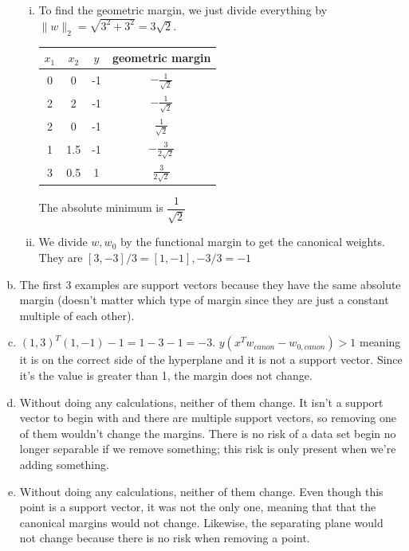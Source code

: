 \documentclass[12pt]{article}
\begin{document}
\begin{enumerate}[(a)]
\begin{enumerate}[i.]
			\item To find the geometric margin, we just divide everything by $ \|w\|_{2} = \sqrt{3^2 + 3^2}  = 3\sqrt{2}$.
			\begin{table}[H]
				\centering
				\begin{tabular}{|c|c|c|c|}
					\hline 
					$x_1$ & $ x_2 $ & $ y $ & geometric margin\\\hline
					\hline
					0 & 0 & -1 & $ -\frac{1}{\sqrt{2}} $\\\hline
					2 & 2 & -1 & $ -\frac{1}{\sqrt{2}} $\\\hline
					2 & 0 & -1 & $ \frac{1}{\sqrt{2}} $\\\hline
					1 & 1.5 & -1 & $ -\frac{3}{2\sqrt{2}} $\\\hline
					3 & 0.5 & 1 & $ \frac{3}{2\sqrt{2}} $\\\hline				
				\end{tabular}
			\end{table}
			The absolute minimum is $ \dfrac{1}{\sqrt{2}} $
			
			\item We divide $ w, w_0 $ by the functional margin to get the canonical weights. They are $ [3, -3]/3 = [1, -1], -3/3 = -1 $		
		\end{enumerate}
	
		\item The first 3 examples are support vectors because they have the same absolute margin (doesn't matter which type of margin since they are just a constant multiple of each other).
		
		\item $ (1,3)^T(1,-1) - 1 = 1 -3 -1 = -3 $. $ y(x^Tw_{canon} - w_{0, canon}) > 1 $ meaning it is on the correct side of the hyperplane and it is not a support vector. Since it's the value is greater than 1, the margin does not change.
		
		\item Without doing any calculations, neither of them change. It isn't a support vector to begin with and there are multiple support vectors, so removing one of them wouldn't change the margins. There is no risk of a data set begin no longer separable if we remove something; this risk is only present when we're adding something.
		
		\item Without doing any calculations, neither of them change. Even though this point is a support vector, it was not the only one, meaning that that the canonical margins would not change. Likewise, the separating plane would not change because there is no risk when removing a point.
		

\end{enumerate}
\end{document}
